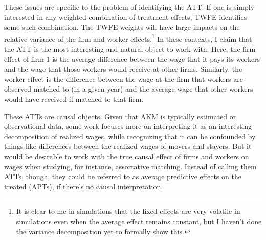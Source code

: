 \documentclass{article}
\begin{document}
These issues are specific to the problem of identifying the ATT. If one is simply interested in any weighted combination of treatment effects, TWFE identifies some such combination. The TWFE weights will have large impacts on the relative variance of the firm and worker effects.\footnote{It is clear to me in simulations that the fixed effects are very volatile in simulations even when the average effect remains constant, but I haven't done the variance decomposition yet to formally show this.} In these contexts, I claim that the ATT is the most interesting and natural object to work with. Here, the firm effect of firm $1$ is the average difference between the wage that it pays its workers and the wage that those workers would receive at other firms. Similarly, the worker effect is the difference between the wage at the firm that workers are observed matched to (in a given year) and the average wage that other workers would have received if matched to that firm. %

These ATTs are causal objects. Given that AKM is typically estimated on observational data, some work focuses more on interpreting it as an interesting decomposition of realized wages, while recognizing that it can be confounded by things like differences between the realized wages of movers and stayers. But it would be desirable to work with the true causal effect of firms and workers on wages when studying, for instance, assortative matching. Instead of calling them ATTs, though, they could be referred to as average predictive effects on the treated (APTs), if there's no causal interpretation.
\end{document}

